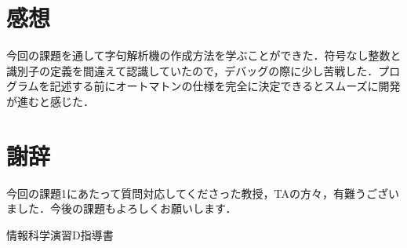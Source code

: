 \documentclass[dvipdfmx]{jarticle}
\begin{document}
\section{感想}
今回の課題を通して字句解析機の作成方法を学ぶことができた．符号なし整数と識別子の定義を間違えて認識していたので，デバッグの際に少し苦戦した．プログラムを記述する前にオートマトンの仕様を完全に決定できるとスムーズに開発が進むと感じた．
\section{謝辞}
今回の課題1にあたって質問対応してくださった教授，TAの方々，有難うございました．今後の課題もよろしくお願いします．
\begin{thebibliography}{1}
     情報科学演習D指導書
\end{thebibliography}
\end{document}
